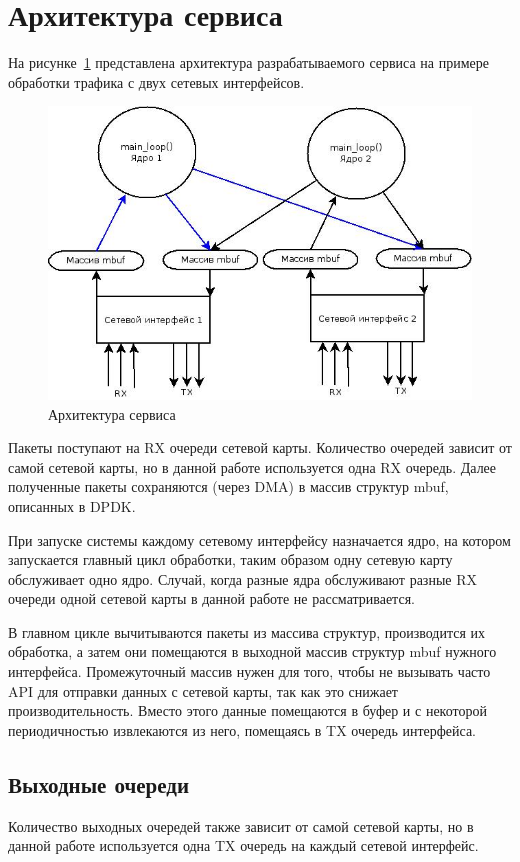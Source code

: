 \section{Архитектура сервиса}
На рисунке~\ref{pic:concept_schema} представлена архитектура разрабатываемого сервиса на примере обработки трафика с двух сетевых интерфейсов.
\begin{figure}[h]
\centering
\includegraphics[scale=0.6]{pictures/concept_schema}
\caption{Архитектура сервиса}
\label{pic:concept_schema}
\end{figure}

Пакеты поступают на RX очереди сетевой карты. Количество очередей зависит от самой сетевой карты, но в данной работе используется одна RX очередь. Далее полученные пакеты сохраняются (через DMA) в массив структур mbuf, описанных в DPDK.

При запуске системы каждому сетевому интерфейсу назначается ядро, на котором запускается главный цикл обработки, таким образом одну сетевую карту обслуживает одно ядро. Случай, когда разные ядра обслуживают разные RX очереди одной сетевой карты в данной работе не рассматривается.

В главном цикле вычитываются пакеты из массива структур, производится их обработка, а затем они помещаются  в выходной массив структур mbuf нужного интерфейса. Промежуточный массив нужен для того, чтобы не вызывать часто API для отправки данных с сетевой карты, так как это снижает производительность. Вместо этого данные помещаются в буфер и с некоторой периодичностью извлекаются из него, помещаясь в TX очередь интерфейса.

\subsection{Выходные очереди}
Количество выходных очередей также зависит от самой сетевой карты, но в данной работе используется одна TX очередь на каждый сетевой интерфейс.

